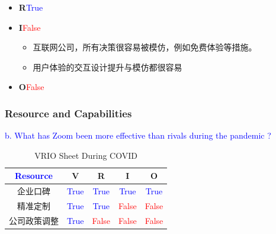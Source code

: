 \documentclass{beamer}
\begin{document}
\begin{frame}[allowframebreaks]
\begin{enumerate}
\begin{itemize}
        \item \textbf{R}\quad \textcolor{blue}{True}
        \item \textbf{I}\quad \textcolor{red}{False}
        \begin{itemize}
            \item 互联网公司，所有决策很容易被模仿，例如免费体验等措施。
            \item 用户体验的交互设计提升与模仿都很容易
        \end{itemize}
        \item \textbf{O}\quad \textcolor{red}{False}
    \end{itemize}
\end{enumerate}




    \frametitle{Resource and Capabilities}
    \textcolor{blue}{b.	What has Zoom been more effective than rivals during the pandemic ?}
    \begin{table}
    \begin{tabular}{c c c c c}
    \toprule
    \textcolor{blue}{\textbf{Resource}} & \textbf{V} & \textbf{R} & \textbf{I} & \textbf{O} \\
    \midrule
    企业口碑  & \textcolor{blue}{True} & \textcolor{blue}{True} & \textcolor{blue}{True} & \textcolor{blue}{True}\\
    精准定制 & \textcolor{blue}{True} & \textcolor{blue}{True} & \textcolor{red}{False} & \textcolor{red}{False} \\
    公司政策调整 & \textcolor{blue}{True} & \textcolor{red}{False} & \textcolor{red}{False} & \textcolor{red}{False} \\
    \bottomrule
    \end{tabular}
    \caption{VRIO Sheet During COVID}
    \end{table}
    
    

\end{frame}
\end{document}
